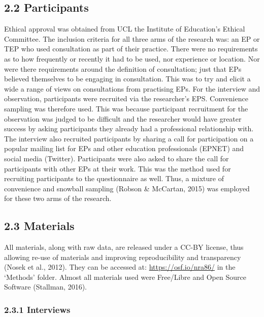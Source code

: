 \documentclass[
  english,
  man]{apa7}
\begin{document}
\hypertarget{participants}{%
\subsection{2.2 Participants}\label{participants}}

Ethical approval was obtained from UCL the Institute of Education's Ethical Committee. The inclusion criteria for all three arms of the research was: an EP or TEP who used consultation as part of their practice. There were no requirements as to how frequently or recently it had to be used, nor experience or location. Nor were there requirements around the definition of consultation; just that EPs believed themselves to be engaging in consultation. This was to try and elicit a wide a range of views on consultations from practising EPs. For the interview and observation, participants were recruited via the researcher's EPS. Convenience sampling was therefore used. This was because participant recruitment for the observation was judged to be difficult and the researcher would have greater success by asking participants they already had a professional relationship with. The interview also recruited participants by sharing a call for participation on a popular mailing list for EPs and other education professionals (EPNET) and social media (Twitter). Participants were also asked to share the call for participants with other EPs at their work. This was the method used for recruiting participants to the questionnaire as well. Thus, a mixture of convenience and snowball sampling (Robson \& McCartan, 2015) was employed for these two arms of the research.

\hypertarget{materials}{%
\subsection{2.3 Materials}\label{materials}}

All materials, along with raw data, are released under a CC-BY license, thus allowing re-use of materials and improving reproducibility and transparency (Nosek et al., 2012). They can be accessed at: \url{https://osf.io/nra86/} in the `Methods' folder. Almost all materials used were Free/Libre and Open Source Software (Stallman, 2016).

\hypertarget{interviews}{%
\subsubsection{2.3.1 Interviews}\label{interviews}}
\end{document}
